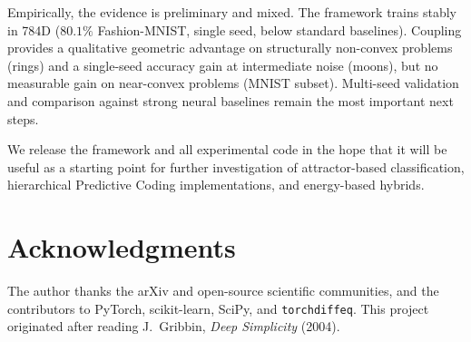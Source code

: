 \documentclass[11pt,a4paper]{article}
\begin{document}
Empirically, the evidence is preliminary and mixed. The framework trains stably in 784D
($80.1\%$ Fashion-MNIST, single seed, below standard baselines). Coupling provides a
qualitative geometric advantage on structurally non-convex problems (rings) and a
single-seed accuracy gain at intermediate noise (moons), but no measurable gain on
near-convex problems (MNIST subset). Multi-seed validation and comparison against strong
neural baselines remain the most important next steps.

We release the framework and all experimental code in the hope that it will be useful as
a starting point for further investigation of attractor-based classification, hierarchical
Predictive Coding implementations, and energy-based hybrids.

\section*{Acknowledgments}

The author thanks the arXiv and open-source scientific communities, and the contributors
to PyTorch, scikit-learn, SciPy, and \texttt{torchdiffeq}. This project originated after
reading J.~Gribbin, \textit{Deep Simplicity} (2004).
\end{document}
